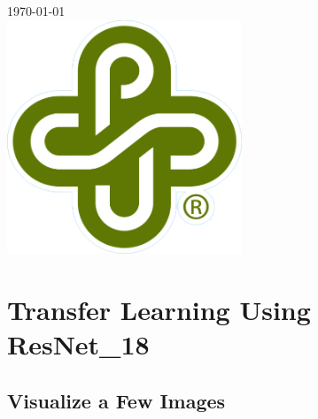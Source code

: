 \documentclass[12pt]{article}
\begin{document}
\begin{titlepage}
		
		
		{\large \today}\\[0.7cm] %
		
		
		\includegraphics[width=7cm]{PSU_LOGO.png}\\[.5cm] %
		
		
		\vfill %
		
	\end{titlepage}
	\newpage
	
	
	
	\section{Transfer Learning Using ResNet\_18}
		\subsection{Visualize a Few Images}
		
\end{document}
